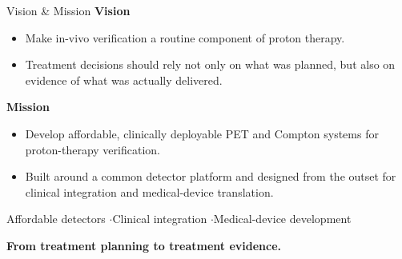 \documentclass[aspectratio=169,11pt]{beamer}
\newcommand{\hi}[1]{\textcolor{crRed}{#1}}
\begin{document}
\begin{frame}{Vision \& Mission}
\small
\textbf{\color{crBlue}Vision}
\begin{itemize}
\item Make \hi{in-vivo verification a routine component of proton therapy}.
\item Treatment decisions should rely not only on what was planned, but also on \hi{evidence of what was actually delivered}.
\end{itemize}
\par\vspace{3mm}
\textbf{\color{crBlue}Mission}
\begin{itemize}
\item Develop \hi{affordable, clinically deployable PET and Compton systems} for proton-therapy verification.
\item Built around a common detector platform and designed from the outset for \hi{clinical integration} and \hi{medical-device translation}.
\end{itemize}
\par\vspace{5mm}
\centering
Affordable detectors \quad$\cdot$\quad Clinical integration \quad$\cdot$\quad Medical-device development
\par\vspace{2mm}
\textbf{From treatment planning to treatment evidence.}
\end{frame}
\end{document}
